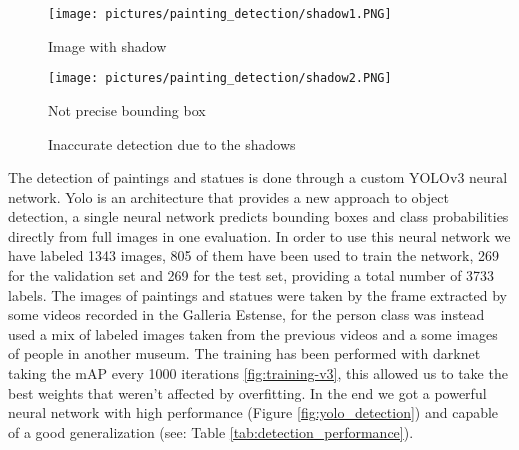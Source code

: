 \begin{figure*}[h]
      \texttt{[image: pictures/painting\_detection/shadow1.PNG]}
      \caption*{Image with shadow}\label{fig:shadow1}
    \endminipage\hfill
      \texttt{[image: pictures/painting\_detection/shadow2.PNG]}
      \caption*{Not precise bounding box}\label{fig:shadow2}
    \endminipage\hfill
    \caption{Inaccurate detection due to the shadows}\label{fig:innaccurate_detection}
\end{figure*}










The detection of paintings and statues is done through a custom YOLOv3 neural network.\cite{yolov3}
Yolo is an architecture that provides a new approach to object detection, a single neural network predicts bounding boxes and class probabilities directly from full images in one evaluation.
In order to use this neural network we have labeled 1343 images, 805 of them have been used to train the network, 269 for the validation set and 269 for the test set, providing a total number of 3733 labels. The images of paintings and statues were taken by the frame extracted by some videos recorded in the Galleria Estense, for the person class was instead used a mix of labeled images taken from the previous videos and a some images of people in another museum.
The training has been performed with darknet \cite{darknet} taking the mAP every 1000 iterations \ref{fig:training-v3}, this allowed us to take the best weights that weren't affected by overfitting.
In the end we got a powerful neural network with high performance (Figure \ref{fig:yolo_detection}) and capable of a good generalization (see: Table \ref{tab:detection_performance}).



